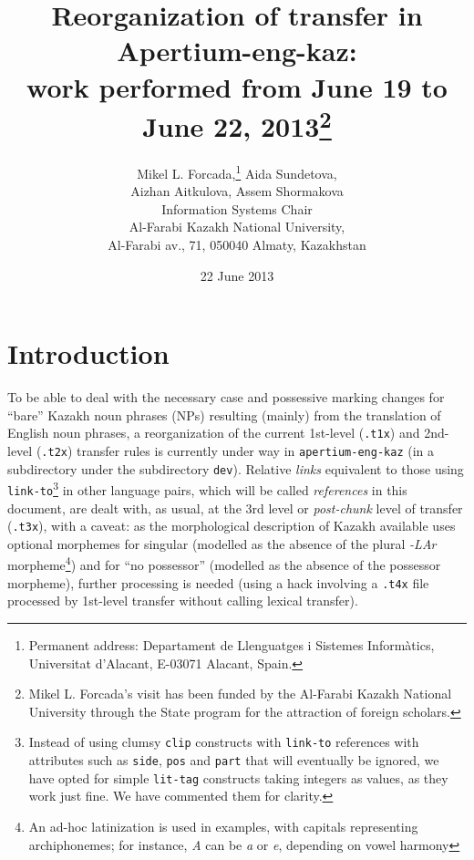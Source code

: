 \documentclass{article}
\title{Reorganization of transfer in Apertium-eng-kaz: \\ work performed from June 19 to June 22, 2013\footnote{Mikel L. Forcada's visit has been  funded by the Al-Farabi Kazakh National University through the State program for the attraction of foreign scholars.}}
\author{Mikel L. Forcada,\footnote{Permanent address: Departament de Llenguatges i Sistemes Inform\`{a}tics, Universitat d'Alacant, E-03071 Alacant, Spain.} Aida Sundetova, \\ 
Aizhan Aitkulova, Assem Shormakova \\ 
Information Systems Chair \\ Al-Farabi Kazakh National University, \\ Al-Farabi av., 71, 050040 Almaty, Kazakhstan}
\date{22 June 2013}
\begin{document}
\maketitle

\section{Introduction}
To be able to deal with the necessary case and possessive marking changes for ``bare'' Kazakh noun phrases (NPs) resulting (mainly) from the translation of English noun phrases, a reorganization of the current 1st-level (\texttt{.t1x}) and 2nd-level (\texttt{.t2x}) transfer rules is currently under way in \texttt{apertium-eng-kaz} (in a subdirectory under the subdirectory \texttt{dev}). Relative \emph{links} equivalent to those using \texttt{link-to}\footnote{Instead of using clumsy \texttt{clip} constructs with \texttt{link-to} references with attributes such as \texttt{side}, \texttt{pos} and \texttt{part} that will eventually be ignored, we have opted for simple \texttt{lit-tag} constructs taking integers as values, as they work just fine. We have commented them for clarity.} in other language pairs, which will be called \emph{references} in this document, are dealt with, as usual, at the 3rd level or \emph{post-chunk} level of transfer (\texttt{.t3x}), with a caveat: as the morphological description of Kazakh available uses optional morphemes for singular (modelled as the absence of the plural \emph{-LAr} morpheme\footnote{An ad-hoc latinization is used in examples, with capitals representing archiphonemes; for instance, \emph{A} can be \emph{a} or \emph{e}, depending on vowel harmony}) and for ``no possessor'' (modelled as the absence of the possessor morpheme), further processing is  needed (using a hack involving a \texttt{.t4x} file processed by 1st-level transfer without calling lexical transfer). 
\end{document}
